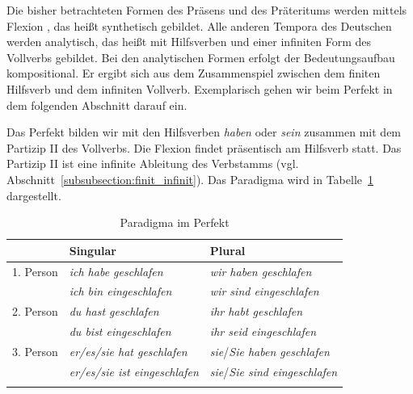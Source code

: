 Die bisher betrachteten Formen des Präsens und des Präteritums werden mittels Flexion , das heißt synthetisch gebildet. Alle anderen Tempora des Deutschen werden analytisch, das heißt mit Hilfsverben und einer infiniten Form des Vollverbs gebildet. Bei den analytischen Formen erfolgt der Bedeutungsaufbau kompositional. Er ergibt sich aus dem Zusammenspiel zwischen dem finiten Hilfsverb und dem infiniten Vollverb. Exemplarisch gehen wir beim Perfekt in dem folgenden Abschnitt darauf ein. 


\label{subsubsubsection:Perfekt}

Das Perfekt bilden wir mit den Hilfsverben \textit{haben} oder \textit{sein} zusammen mit dem Partizip II des Vollverbs. Die Flexion findet präsentisch am Hilfsverb statt. Das Partizip II ist eine infinite Ableitung des Verbstamms (vgl. Abschnitt~\ref{subsubsection:finit_infinit}). Das Paradigma wird in Tabelle~\ref{tab:Perfekt} dargestellt.

\begin{table}
  \centering
  \begin{tabular}{l l l}
    \lsptoprule
    &  Singular & Plural \\
    \hline
    1. Person & \textit{ich habe geschlafen}  & \textit{wir haben geschlafen} \\
    & \textit{ich bin eingeschlafen} & \textit{wir sind eingeschlafen} \\
    
    2. Person & \textit{du hast geschlafen}  & \textit{ihr habt geschlafen} \\
    & \textit{du bist eingeschlafen} & \textit{ihr seid eingeschlafen} \\
    
    3. Person & \textit{er/es/sie hat geschlafen} & \textit{sie}/\textit{Sie haben geschlafen} \\
    & \textit{er/es/sie ist eingeschlafen} & \textit{sie}/\textit{Sie sind eingeschlafen} \\
    \lspbottomrule 
  \end{tabular}
  \caption{Paradigma im Perfekt}
  \label{tab:Perfekt}
\end{table}

